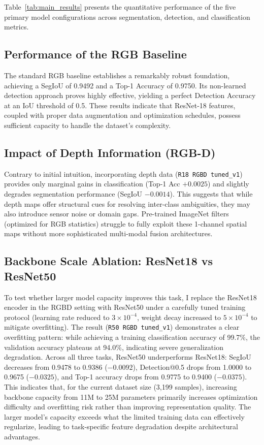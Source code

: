 \documentclass[conference]{IEEEtran}
\begin{document}
Table~\ref{tab:main_results} presents the quantitative performance of the five primary model configurations across segmentation, detection, and classification metrics.

\subsection{Performance of the RGB Baseline}
The standard RGB baseline establishes a remarkably robust foundation, achieving a SegIoU of 0.9492 and a Top-1 Accuracy of 0.9750. Its non-learned detection approach proves highly effective, yielding a perfect Detection Accuracy at an IoU threshold of 0.5. These results indicate that ResNet-18 features, coupled with proper data augmentation and optimization schedules, possess sufficient capacity to handle the dataset's complexity.

\subsection{Impact of Depth Information (RGB-D)}
Contrary to initial intuition, incorporating depth data (\texttt{R18 RGBD tuned\_v1}) provides only marginal gains in classification (Top-1 Acc $+0.0025$) and slightly degrades segmentation performance (SegIoU $-0.0014$). This suggests that while depth maps offer structural cues for resolving inter-class ambiguities, they may also introduce sensor noise or domain gaps. Pre-trained ImageNet filters (optimized for RGB statistics) struggle to fully exploit these 1-channel spatial maps without more sophisticated multi-modal fusion architectures.

\subsection{Backbone Scale Ablation: ResNet18 vs ResNet50}
To test whether larger model capacity improves this task, I replace the ResNet18 encoder in the RGBD setting with ResNet50 under a carefully tuned training protocol (learning rate reduced to $3\times10^{-4}$, weight decay increased to $5\times10^{-4}$ to mitigate overfitting). The result (\texttt{R50 RGBD tuned\_v1}) demonstrates a clear overfitting pattern: while achieving a training classification accuracy of 99.7\%, the validation accuracy plateaus at 94.0\%, indicating severe generalization degradation. Across all three tasks, ResNet50 underperforms ResNet18: SegIoU decreases from 0.9478 to 0.9386 ($-0.0092$), Detection@0.5 drops from 1.0000 to 0.9675 ($-0.0325$), and Top-1 accuracy drops from 0.9775 to 0.9400 ($-0.0375$). This indicates that, for the current dataset size (3,199 samples), increasing backbone capacity from 11M to 25M parameters primarily increases optimization difficulty and overfitting risk rather than improving representation quality. The larger model's capacity exceeds what the limited training data can effectively regularize, leading to task-specific feature degradation despite architectural advantages.
\end{document}
